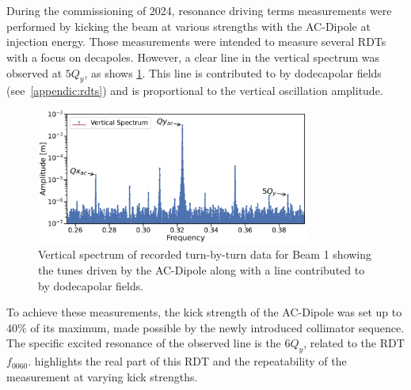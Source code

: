\section{}


During the commissioning of 2024, resonance driving terms measurements were performed by kicking the
beam at various strengths with the AC-Dipole at injection energy. Those measurements were intended
to measure several RDTs with a focus on decapoles.
However, a clear line in the vertical spectrum was observed at $5Q_y$, as shows
\cref{fig:high_orders:spectrum_dodecapole_5qy}. This line is contributed to by dodecapolar fields
(see \cref{appendic:rdts}) and is proportional to the vertical oscillation amplitude.

\begin{figure}[!htb]
    \centering
    \includegraphics[width=0.8\textwidth]{./images/spectrum_dodecapole_5qy.pdf}
    \caption{Vertical spectrum of recorded turn-by-turn data for Beam 1 showing the tunes driven by the
    AC-Dipole along with a line contributed to by dodecapolar fields.}
    \label{fig:high_orders:spectrum_dodecapole_5qy}
\end{figure}

To achieve these measurements, the kick strength of the AC-Dipole was set up to $40\%$ of its
maximum, made possible by the newly introduced collimator sequence. The specific excited resonance
of the observed line is the $6Q_y$, related to the RDT $f_{0060}$.
 highlights the real part of this RDT and the repeatability
of the measurement at varying kick strengths.

